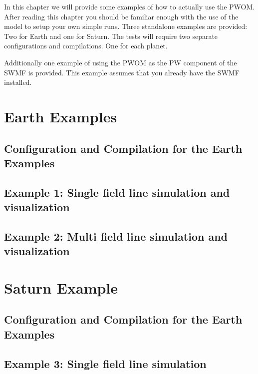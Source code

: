 In this chapter we will provide some examples of how to actually use the 
PWOM. After reading this chapter you should be familiar enough with the 
use of the model to setup your own simple runs. Three standalone examples are 
provided: 
Two for Earth and one for Saturn. The tests will require two separate 
configurations and compilations. One for each planet.

Additionally one example of using the PWOM as the PW component of the SWMF 
is provided. This example assumes that you already have the SWMF installed. 
 

\section{Earth Examples}

\subsection{Configuration and Compilation for the Earth Examples}

\subsection{Example 1: Single field line simulation and visualization}

\subsection{Example 2: Multi field line simulation and visualization}

\section{Saturn Example}

\subsection{Configuration and Compilation for the Earth Examples}

\subsection{Example 3: Single field line simulation}
